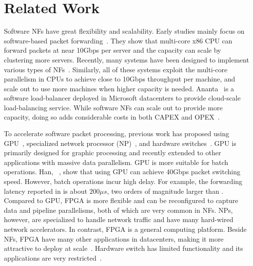 
\section{Related Work}
\label{clicknp:sec:related}

Software NFs have great flexibility and scalability.
Early studies mainly focus on software-based packet forwarding~\cite{routebricks, Egi:2008:THP:1544012.1544032 }. 
They show that multi-core x86 CPU can forward packets at near 10Gbps per server
and the capacity can scale by clustering more servers. 
%
Recently, many  systems have been designed to implement various types of NFs~\cite{comb, Greenhalgh:2009:FPR:1517480.1517484, martins2014clickos}. 
Similarly, all of these systems exploit the multi-core parallelism in CPUs to achieve close to 10Gbps 
throughput per machine, and scale out to use more machines when higher capacity is needed. 
%
Ananta~\cite{ananta} is a software load-balancer deployed in Microsoft datacenters to provide 
cloud-scale load-balancing service.
%
While software NFs can scale out to provide more capacity, doing so adds 
considerable costs in both CAPEX and OPEX~\cite{ananta, duet}.

To accelerate software packet processing, previous work has proposed using GPU~\cite{packetshader},
specialized network processor (NP)~\cite{cavium,netronome }, and hardware switches~\cite{duet}.
GPU is primarily designed for graphic processing and recently extended to other applications with massive 
data parallelism. GPU is more suitable for batch operations. Han, \etal~\cite{packetshader}, show that using GPU
can achieve 40Gbps packet switching speed. 
However, batch operations incur high delay. 
For example, the forwarding latency reported in \cite{packetshader} is about $200\mu s$, two orders of 
magnitude larger than \name.
Compared to GPU, FPGA is more flexible and can be reconfigured to capture data and pipeline parallelisms, both of which are very common in NFs.
NPs, however, are specialized to handle network traffic and have many hard-wired network accelerators.
In contrast, FPGA is a general computing platform. 
Beside NFs, FPGA have many other applications in datacenters, making it more attractive 
to deploy at scale~\cite{putnam2014reconfigurable}.
%
Hardware switch has limited functionality and its applications are very restricted~\cite{duet}.

